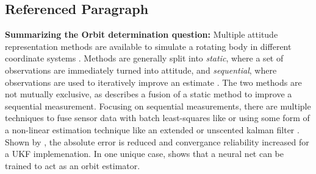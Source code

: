 \subsection{Referenced Paragraph}

\textbf{Summarizing the Orbit determination question:} Multiple attitude representation methods are available to simulate a rotating body in different coordinate systems \cite{SurveyOfAttitudeRepresentationShuster}. Methods are generally split into \textit{static}, where a set of observations are immediately turned into attitude, and \textit{sequential}, where observations are used to iteratively improve an estimate \cite{habibComparativeStudySpacecraft2013} {\cite{wertzSpacecraftAttitudeDetermination1978Ch13}}. The two methods are not mutually exclusive, as \cite{kinatasTRIADAidedMultiplicativeEKF2023} describes a fusion of a static method to improve a sequential measurement. Focusing on sequential measurements, there are multiple techniques to fuse sensor data with batch least-squares like \cite{wangRealTimeLEOSatellite2022} or using some form of a non-linear estimation technique like an extended \cite{takatsyAttitudeDeterminationNanosatellites2022} or unscented kalman filter \cite{yingSmallSatelliteMagnetic2006}. Shown by {\cite[Tab. 4]{pardalRobustnessAssessmentSigma2011}}, the absolute error is reduced and convergance reliability increased for a UKF implemenation. In one unique case, \cite{scorsoglioPhysicInformedNeuralNetwork2023} shows that a neural net can be trained to act as an orbit estimator.
